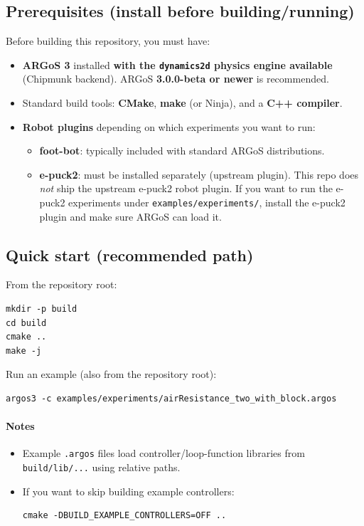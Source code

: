 \documentclass[11pt,a4paper]{article}
\begin{document}
\subsection{Prerequisites (install before building/running)}
Before building this repository, you must have:

\begin{itemize}
  \item \textbf{ARGoS 3} installed \textbf{with the \texttt{dynamics2d} physics engine available} (Chipmunk backend).
        ARGoS \textbf{3.0.0-beta or newer} is recommended.
  \item Standard build tools: \textbf{CMake}, \textbf{make} (or Ninja), and a \textbf{C++ compiler}.
  \item \textbf{Robot plugins} depending on which experiments you want to run:
    \begin{itemize}
      \item \textbf{foot-bot}: typically included with standard ARGoS distributions.
      \item \textbf{e-puck2}: must be installed separately (upstream plugin). This repo does \emph{not} ship the upstream e-puck2 robot plugin.
            If you want to run the e-puck2 experiments under \texttt{examples/experiments/}, install the e-puck2 plugin and make sure ARGoS can load it.
    \end{itemize}
\end{itemize}

\subsection{Quick start (recommended path)}
From the repository root:
\begin{lstlisting}
mkdir -p build
cd build
cmake ..
make -j
\end{lstlisting}

Run an example (also from the repository root):
\begin{lstlisting}
argos3 -c examples/experiments/airResistance_two_with_block.argos
\end{lstlisting}

\paragraph{Notes}
\begin{itemize}
  \item Example \texttt{.argos} files load controller/loop-function libraries from \texttt{build/lib/...} using relative paths.
  \item If you want to skip building example controllers:
\begin{lstlisting}
cmake -DBUILD_EXAMPLE_CONTROLLERS=OFF ..
\end{lstlisting}
\end{itemize}
\end{document}
